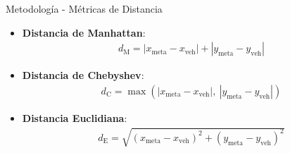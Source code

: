 \documentclass{beamer}
\begin{document}
\begin{frame}{Metodología - Métricas de Distancia}
  \begin{itemize}
    \item \textbf{Distancia de Manhattan}:
  \begin{align*}
    d_{\text{M}} = |x_{\text{meta}} - x_{\text{veh}}| + |y_{\text{meta}} - y_{\text{veh}}|
  \end{align*}
  
    \item \textbf{Distancia de Chebyshev}:
    \begin{align*}
        d_{\text{C}} = \max\left( |x_{\text{meta}} - x_{\text{veh}}|,\  |y_{\text{meta}} - y_{\text{veh}}| \right)
    \end{align*}

    \item \textbf{Distancia Euclidiana}:
    \begin{align*}
        d_{\text{E}} = \sqrt{(x_{\text{meta}} - x_{\text{veh}})^2 + (y_{\text{meta}} - y_{\text{veh}})^2}    
    \end{align*}

  \end{itemize}
\end{frame}
\end{document}
